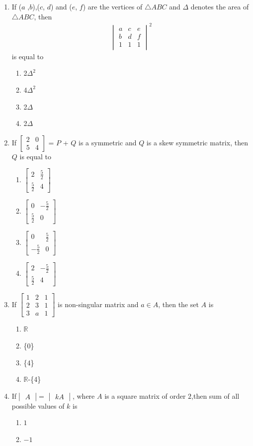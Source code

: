 \documentclass[12pt,-letter paper]{article}
\providecommand{\mydet}[1]{\ensuremath{\begin{vmatrix}#1\end{vmatrix}}}
\providecommand{\myvec}[1]{\ensuremath{\begin{bmatrix}#1\end{bmatrix}}}
\newcommand{\mycbrac}[1]{\{#1\}}
\begin{document}
\begin{enumerate}
\item If ($a$ ,$b$),($c$, $d$) and ($e$, $f$) are the vertices of $\triangle$$ABC$ and $\Delta$ denotes the area of $\triangle$$ABC$, then 
  \begin{align}
      \mydet{a & c & e\\b & d& f\\1&1&1}^2 
  \end{align}  
 is equal to
\begin{enumerate}[label=(\alph*)]
    \item 2$\Delta ^2$
    \item 4$\Delta ^2$ 
    \item 2$\Delta$
    \item 2$\Delta$
\end{enumerate}
    \item If $\myvec{2 & 0 \\5 & 4}$ = $P$ + $Q$ 
is a symmetric and $Q$ is a skew symmetric matrix, then $Q$ is equal to
\begin{enumerate}[label=(\alph*)]
    \item $\myvec{2  & \frac{5}{2} \\\frac{5}{2} & 4 }$
    \item $\myvec{ 0 & -\frac{5}{2} \\\frac{5}{2} & 0}$
    \item $\myvec{ 0 & \frac{5}{2} \\-\frac{5}{2} & 0}$
    \item $\myvec{2 & -\frac{5}{2} \\\frac{5}{2} & 4 }$
\end{enumerate}
\item If $\myvec{1 & 2 & 1 \\2 & 3 & 1 \\3 & a & 1}$
is non-singular matrix and  $a \in A $, then the set $A$ is 
\begin{enumerate}[label=(\alph*)]
    \item $\mathbb{R}$
    \item \mycbrac{0}
    \item \mycbrac{4}
    \item $\mathbb{R}$-\mycbrac{4}
\end{enumerate}
\item If$\mydet{A} $= $\mydet{ kA}$, where $A$ is a square matrix of order $2$,then sum of all possible values of $k$ is
\begin{enumerate}[label=(\alph*)]
    \item $1$
    \item $-1$

\end{enumerate}
\end{enumerate}
\end{document}
